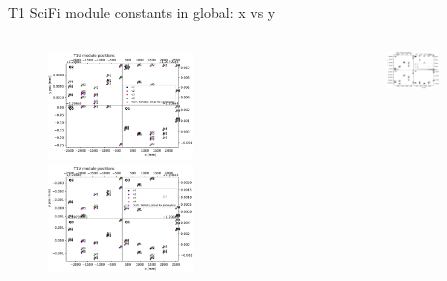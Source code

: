\documentclass[aspectratio=1610, 12pt]{beamer}
\begin{document}
\begin{frame}{T1 SciFi module constants in global: x vs y}
  \begin{columns}
    \begin{column}[c]{0.5\textwidth}
      \begin{figure}
        \includegraphics[width=0.61\textwidth]{plots/out_x_y_pos/retest_x_vs_zT1U.pdf}
        \includegraphics[width=0.61\textwidth]{plots/out_x_y_pos/retest_x_vs_zT1V.pdf}
      \end{figure}
    \end{column}
    \begin{column}[c]{0.5\textwidth}
      \begin{figure}
        \includegraphics[width=0.61\textwidth]{plots/out_x_y_pos/retest_x_vs_zT1X1.pdf}

\end{figure}
\end{column}
\end{columns}
\end{frame}
\end{document}
